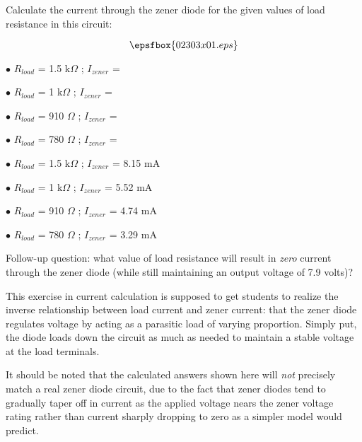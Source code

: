 

Calculate the current through the zener diode for the given values of load resistance in this circuit:

$$\epsfbox{02303x01.eps}$$

\medskip
\goodbreak
\item{$\bullet$} $R_{load}$ = 1.5 k$\Omega$ ; $I_{zener}$ =
\item{$\bullet$} $R_{load}$ = 1 k$\Omega$ ; $I_{zener}$ =
\item{$\bullet$} $R_{load}$ = 910 $\Omega$ ; $I_{zener}$ =
\item{$\bullet$} $R_{load}$ = 780 $\Omega$ ; $I_{zener}$ =
\medskip







\medskip
\goodbreak
\item{$\bullet$} $R_{load}$ = 1.5 k$\Omega$ ; $I_{zener}$ = 8.15 mA
\item{$\bullet$} $R_{load}$ = 1 k$\Omega$ ; $I_{zener}$ = 5.52 mA
\item{$\bullet$} $R_{load}$ = 910 $\Omega$ ; $I_{zener}$ = 4.74 mA
\item{$\bullet$} $R_{load}$ = 780 $\Omega$ ; $I_{zener}$ = 3.29 mA
\medskip

\vskip 10pt

Follow-up question: what value of load resistance will result in {\it zero} current through the zener diode (while still maintaining an output voltage of 7.9 volts)?







This exercise in current calculation is supposed to get students to realize the inverse relationship between load current and zener current: that the zener diode regulates voltage by acting as a parasitic load of varying proportion.  Simply put, the diode loads down the circuit as much as needed to maintain a stable voltage at the load terminals.

It should be noted that the calculated answers shown here will {\it not} precisely match a real zener diode circuit, due to the fact that zener diodes tend to gradually taper off in current as the applied voltage nears the zener voltage rating rather than current sharply dropping to zero as a simpler model would predict.

